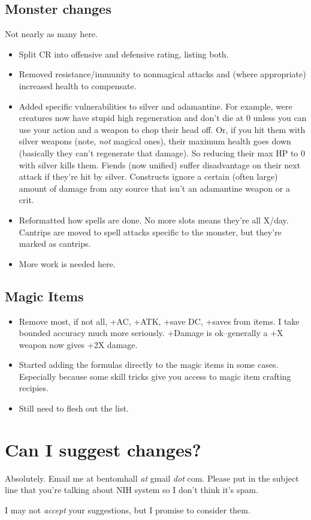 \subsection*{Monster changes}
Not nearly as many here.
\begin{itemize}
    \item Split CR into offensive and defensive rating, listing both.
    \item Removed resistance/immunity to nonmagical attacks and (where appropriate) increased health to compensate.
    \item Added specific vulnerabilities to silver and adamantine. For example, were creatures now have stupid high regeneration and don't die at 0 unless you can use your action and a weapon to chop their head off. Or, if you hit them with silver weapons (note, \textit{not} magical ones), their maximum health goes down (basically they can't regenerate that damage). So reducing their max HP to 0 with silver kills them. Fiends (now unified) suffer disadvantage on their next attack if they're hit by silver. Constructs ignore a certain (often large) amount of damage from any source that isn't an adamantine weapon or a crit.
    \item Reformatted how spells are done. No more slots means they're all X/day. Cantrips are moved to spell attacks specific to the monster, but they're marked as cantrips.
    \item More work is needed here.
\end{itemize}
\subsection*{Magic Items}
\begin{itemize}
    \item Remove most, if not all, +AC, +ATK, +save DC, +saves from items. I take bounded accuracy much more seriously. +Damage is ok--generally a +X weapon now gives +2X damage.
    \item Started adding the formulas directly to the magic items in some cases. Especially because some skill tricks give you access to magic item crafting recipies.
		\item Still need to flesh out the list.
\end{itemize}

\section{Can I suggest changes?}
Absolutely. Email me at bentomhall \textit{at} gmail \textit{dot} com. Please put in the subject line that you're talking about NIH system so I don't think it's spam.

I may not \textit{accept} your suggestions, but I promise to consider them.